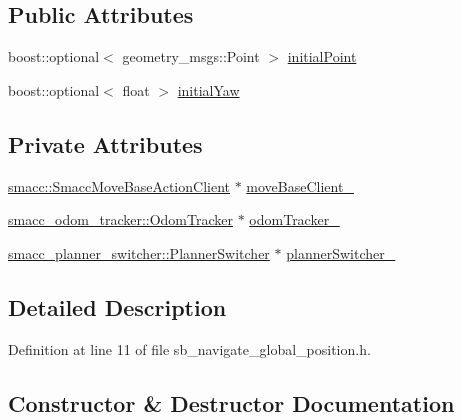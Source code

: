 \subsection*{Public Attributes}
\begin{DoxyCompactItemize}
\item 
boost\+::optional$<$ geometry\+\_\+msgs\+::\+Point $>$ \hyperlink{classSbNavigateGlobalPosition_a676844c9140653b6bc60e8efaa75df44}{initial\+Point}
\item 
boost\+::optional$<$ float $>$ \hyperlink{classSbNavigateGlobalPosition_a3c2a5e765e4a7f4bfe19c458ab469515}{initial\+Yaw}
\end{DoxyCompactItemize}
\subsection*{Private Attributes}
\begin{DoxyCompactItemize}
\item 
\hyperlink{classsmacc_1_1SmaccMoveBaseActionClient}{smacc\+::\+Smacc\+Move\+Base\+Action\+Client} $\ast$ \hyperlink{classSbNavigateGlobalPosition_ad98d35df0281643268e2b00450b00af5}{move\+Base\+Client\+\_\+}
\item 
\hyperlink{classsmacc__odom__tracker_1_1OdomTracker}{smacc\+\_\+odom\+\_\+tracker\+::\+Odom\+Tracker} $\ast$ \hyperlink{classSbNavigateGlobalPosition_af7f17a2dabc667afa3a31c1205427ca6}{odom\+Tracker\+\_\+}
\item 
\hyperlink{classsmacc__planner__switcher_1_1PlannerSwitcher}{smacc\+\_\+planner\+\_\+switcher\+::\+Planner\+Switcher} $\ast$ \hyperlink{classSbNavigateGlobalPosition_a27d990af827d8d99779285641110b9d1}{planner\+Switcher\+\_\+}
\end{DoxyCompactItemize}


\subsection{Detailed Description}


Definition at line 11 of file sb\+\_\+navigate\+\_\+global\+\_\+position.\+h.



\subsection{Constructor \& Destructor Documentation}
